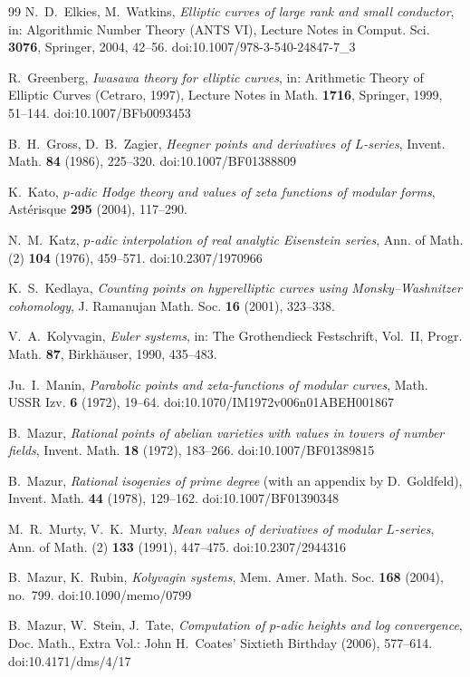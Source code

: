\documentclass[11pt]{amsart}
\theoremstyle{definition}
\begin{document}
\begin{thebibliography}{99}
 N.~D.~Elkies, M.~Watkins, \emph{Elliptic curves of large rank and small conductor}, in: Algorithmic Number Theory (ANTS VI), Lecture Notes in Comput. Sci. \textbf{3076}, Springer, 2004, 42--56. doi:10.1007/978-3-540-24847-7\_3

 R.~Greenberg, \emph{Iwasawa theory for elliptic curves}, in: Arithmetic Theory of Elliptic Curves (Cetraro, 1997), Lecture Notes in Math. \textbf{1716}, Springer, 1999, 51--144. doi:10.1007/BFb0093453

 B.~H.~Gross, D.~B.~Zagier, \emph{Heegner points and derivatives of $L$-series}, Invent. Math. \textbf{84} (1986), 225--320. doi:10.1007/BF01388809

 K.~Kato, \emph{$p$-adic Hodge theory and values of zeta functions of modular forms}, Ast\'erisque \textbf{295} (2004), 117--290.

 N.~M.~Katz, \emph{$p$-adic interpolation of real analytic Eisenstein series}, Ann. of Math. (2) \textbf{104} (1976), 459--571. doi:10.2307/1970966

 K.~S.~Kedlaya, \emph{Counting points on hyperelliptic curves using Monsky--Washnitzer cohomology}, J. Ramanujan Math. Soc. \textbf{16} (2001), 323--338.

 V.~A.~Kolyvagin, \emph{Euler systems}, in: The Grothendieck Festschrift, Vol.~II, Progr. Math. \textbf{87}, Birkh\"auser, 1990, 435--483.

 Ju.~I.~Manin, \emph{Parabolic points and zeta-functions of modular curves}, Math. USSR Izv. \textbf{6} (1972), 19--64. doi:10.1070/IM1972v006n01ABEH001867

 B.~Mazur, \emph{Rational points of abelian varieties with values in towers of number fields}, Invent. Math. \textbf{18} (1972), 183--266. doi:10.1007/BF01389815

 B.~Mazur, \emph{Rational isogenies of prime degree} (with an appendix by D.~Goldfeld), Invent. Math. \textbf{44} (1978), 129--162. doi:10.1007/BF01390348

 M.~R.~Murty, V.~K.~Murty, \emph{Mean values of derivatives of modular $L$-series}, Ann. of Math. (2) \textbf{133} (1991), 447--475. doi:10.2307/2944316

 B.~Mazur, K.~Rubin, \emph{Kolyvagin systems}, Mem. Amer. Math. Soc. \textbf{168} (2004), no.~799. doi:10.1090/memo/0799

 B.~Mazur, W.~Stein, J.~Tate, \emph{Computation of $p$-adic heights and log convergence}, Doc. Math., Extra Vol.: John H.~Coates' Sixtieth Birthday (2006), 577--614. doi:10.4171/dms/4/17


\end{thebibliography}
\end{document}
